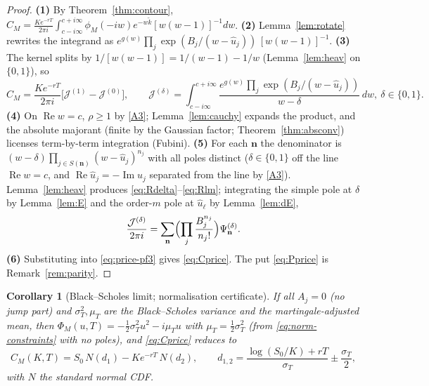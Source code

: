 \documentclass[11pt]{article}
\newtheorem{corollary}[theorem]{Corollary}
\DeclareMathOperator{\Real}{Re}
\DeclareMathOperator{\Imag}{Im}
\begin{document}
\begin{proof}
\textbf{(1)} By Theorem~\ref{thm:contour},
$C_M=\frac{K e^{-rT}}{2\pi i}\int_{c-i\infty}^{c+i\infty}\phi_M(-iw)e^{-w\tilde k}
[w(w-1)]^{-1}dw$.
\textbf{(2)} Lemma~\ref{lem:rotate} rewrites the integrand as
$e^{g(w)}\prod_j\exp(B_j/(w-\hat u_j))\,[w(w-1)]^{-1}$.
\textbf{(3)} The kernel splits by $1/[w(w-1)]=1/(w-1)-1/w$
(Lemma~\ref{lem:heav} on $\{0,1\}$), so
\begin{equation}\label{eq:price-pf3}
C_M=\frac{K e^{-rT}}{2\pi i}\bigl[\mathcal J^{(1)}-\mathcal J^{(0)}\bigr],
\qquad
\mathcal J^{(\delta)}=\int_{c-i\infty}^{c+i\infty}
\frac{e^{g(w)}\prod_j\exp(B_j/(w-\hat u_j))}{w-\delta}\,dw,\ \delta\in\{0,1\}.
\end{equation}
\textbf{(4)} On $\Real w=c$, $\rho\ge1$ by \ref{A3}; Lemma~\ref{lem:cauchy}
expands the product, and the absolute majorant (finite by the Gaussian
factor; Theorem~\ref{thm:absconv}) licenses term-by-term integration
(Fubini).
\textbf{(5)} For each $\mathbf n$ the denominator is $(w-\delta)
\prod_{j\in S(\mathbf n)}(w-\hat u_j)^{n_j}$ with all poles distinct
($\delta\in\{0,1\}$ off the line $\Real w=c$, and $\Real\hat u_j=-\Imag u_j$
separated from the line by \ref{A3}). Lemma~\ref{lem:heav} produces
\eqref{eq:Rdelta}--\eqref{eq:Rlm}; integrating the simple pole at $\delta$
by Lemma~\ref{lem:E} and the order-$m$ pole at $\hat u_\ell$ by
Lemma~\ref{lem:dE},
\begin{equation}\label{eq:price-pf5}
\frac{\mathcal J^{(\delta)}}{2\pi i}
=\sum_{\mathbf n}\Bigl(\prod_j\frac{B_j^{n_j}}{n_j!}\Bigr)
\Psi^{(\delta)}_{\mathbf n}.
\end{equation}
\textbf{(6)} Substituting into \eqref{eq:price-pf3} gives \eqref{eq:Cprice}.
The put \eqref{eq:Pprice} is Remark~\ref{rem:parity}.
\end{proof}

\begin{corollary}[Black--Scholes limit; normalisation certificate]\label{cor:BS}
If all $A_j=0$ (no jump part) and $\sigma_T^2,\mu_T$ are the Black--Scholes
variance and the martingale-adjusted mean, then $\Phi_M(u,T)=-\tfrac12
\sigma_T^2u^2-i\mu_T u$ with $\mu_T=\tfrac12\sigma_T^2$ (from
\eqref{eq:norm-constraints} with no poles), and \eqref{eq:Cprice} reduces to
\begin{equation}\label{eq:BS}
C_M(K,T)=S_0\,N(d_1)-Ke^{-rT}\,N(d_2),\qquad
d_{1,2}=\frac{\log(S_0/K)+rT}{\sigma_T}\pm\frac{\sigma_T}{2},
\end{equation}
with $N$ the standard normal CDF.
\end{corollary}
\end{document}
